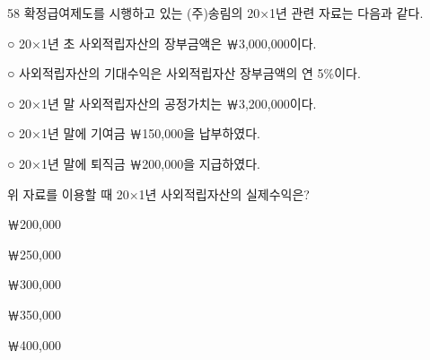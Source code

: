 \begin{question}{58}
확정급여제도를 시행하고 있는 (주)송림의 20×1년 관련 자료는 다음과 같다.
\begin{framedtext}
○ 20×1년 초 사외적립자산의 장부금액은 ￦3,000,000이다. \par
○ 사외적립자산의 기대수익은 사외적립자산 장부금액의 연 5\%이다. \par
○ 20×1년 말 사외적립자산의 공정가치는 ￦3,200,000이다. \par
○ 20×1년 말에 기여금 ￦150,000을 납부하였다. \par
○ 20×1년 말에 퇴직금 ￦200,000을 지급하였다. \par
\end{framedtext}
위 자료를 이용할 때 20×1년 사외적립자산의 실제수익은?
\begin{choices}
  \item ￦200,000
  \item ￦250,000
  \item ￦300,000
  \item ￦350,000
  \item ￦400,000
\end{choices}
\end{question}

